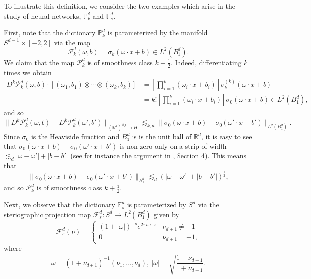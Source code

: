  To illustrate this definition, we consider the two examples which arise in the study of neural networks, $\mathbb{P}^d_k$ and $\mathbb{F}^d_s$. 
 
 First, note that the dictionary $\mathbb{P}^d_k$ is parameterized by the manifold $S^{d-1}\times [-2,2]$ via the map
\begin{equation}\label{p-k-parameterization-definition}
 \mathcal{P}^d_k(\omega,b) = \sigma_k(\omega\cdot x + b)\in L^2(B_1^d).
\end{equation}
We claim that the map $\mathcal{P}^d_k$ is of smoothness class $k + \frac{1}{2}$. Indeed, differentiating $k$ times we obtain
\begin{equation}
\begin{split}
 D^k\mathcal{P}^d_k(\omega,b)\cdot[(\omega_1,b_1)\otimes\cdots\otimes(\omega_k,b_k)] &= \left[\prod_{i=1}^k (\omega_i\cdot x + b_i)\right]\sigma_k^{(k)}(\omega\cdot x + b) \\
 & = k!\left[\prod_{i=1}^k (\omega_i\cdot x + b_i)\right]\sigma_0(\omega\cdot x + b)\in L^2(B_1^d),
\end{split}
\end{equation}
and so
\begin{equation}
 \|D^k\mathcal{P}^d_k(\omega,b) - D^k\mathcal{P}^d_k(\omega',b')\|_{(\mathbb{R}^d)^{\otimes j}\rightarrow H} \lesssim_{k,d} \|\sigma_0(\omega\cdot x + b) - \sigma_0(\omega'\cdot x + b')\|_{L^2(B_1^d)}.
\end{equation}
Since $\sigma_0$ is the Heaviside function and $B_1^d$ is is the unit ball of $\mathbb{R}^d$, it is easy to see that $\sigma_0(\omega\cdot x + b) - \sigma_0(\omega'\cdot x + b')$ is non-zero only on a strip of width $\lesssim_d |\omega - \omega'| + |b - b'|$ (see for instance the argument in \cite{makovoz1996random}, Section 4). This means that
\begin{equation}
 \|\sigma_0(\omega\cdot x + b) - \sigma_0(\omega'\cdot x + b')\|_{B_1^d} \lesssim_d (|\omega - \omega'| + |b - b'|)^{\frac{1}{2}},
\end{equation}
and so $\mathcal{P}^d_k$ is of smoothness class $k+\frac{1}{2}$.

Next, we observe that the dictionary $\mathbb{F}_s^d$ is parameterized by $S^d$ via the steriographic projection map $\mathcal{F}_s^d:S^d\rightarrow L^2(B_1^d)$ given by
\begin{equation}\label{f-s-parameterization-definition}
 \mathcal{F}^d_s(\nu) = \begin{cases} 
          \left(1 + |\omega|\right)^{-s}e^{2\pi i \omega\cdot x} & \nu_{d+1} \neq -1 \\
          0 & \nu_{d+1} = -1,
       \end{cases}
\end{equation}
where $$\omega = (1+\nu_{d+1})^{-1}(\nu_1,...,\nu_d),~|\omega| = \sqrt{\frac{1-\nu_{d+1}}{1+\nu_{d+1}}}.$$

